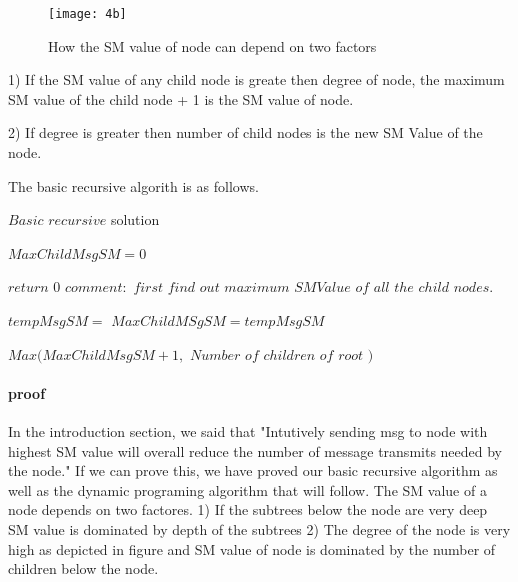 \begin{figure}[4b]
    \centering
    \texttt{[image: 4b]}
    \caption{How the SM value of node can depend on two factors}
\end{figure}




1) If the SM value of any child node is greate then degree of node, the maximum SM value of the child node  + 1 is the SM value of node.

2) If degree is greater then number of child nodes is the new SM Value of the node. 

The basic recursive algorith is as follows. 


\begin{algorithm}
	\caption{$Basic $ $recursive $ solution}
	\begin{algorithmic}
		\State $ MaxChildMsgSM = 0 $
		
			\State $ return$ $ 0$ 	
		\EndIf
	  	\State 		
		\State $ comment: $ $ first $ $ find $ $ out $ $ maximum $ $ SMValue $  $ of $ $ all $ $ the $ $ child $ $ nodes.$		
		
		\State $tempMsgSM =$  
			\State $MaxChildMSgSM = tempMsgSM$
		\EndIf
		\State	
		
		\EndFor
		
		\Return $ Max(MaxChildMsgSM + 1, $ $ Number$ $ of $ $ children $ $ of $ $ root $ $ ) $
			 
	  \EndFunction
	
	  
	\end{algorithmic}
\end{algorithm}


\paragraph{proof}
In the introduction section, we said that "Intutively sending msg to node with highest SM value will overall reduce the number of message transmits needed by the node." If we can prove this, we have proved our basic recursive algorithm as well as the dynamic programing algorithm that will follow. The SM value of a node depends on two factores. 1) If the subtrees below the node are very deep SM value is dominated by depth of the subtrees 2) The degree of the node is very high as depicted in figure and SM value of node is dominated by the number of children below the node. 

